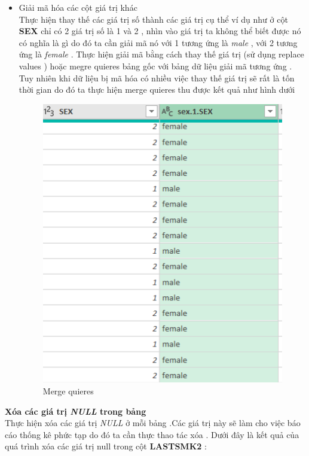 \begin{itemize}
\begin{figure}[!h]
\begin{center}
\end{center}
   \end{figure}
   \item Giải mã hóa các cột giá trị khác \\\hfill
   Thực hiện thay thế các giá trị số thành các giá trị cụ thể ví dụ như ở cột \textbf{SEX} chỉ có 2 giá trị số là 1 và 2 , nhìn vào giá trị ta không thể biết được nó có nghĩa là gì do đó ta cần giải mã nó với 1 tương ứng là\textit{ male} , với 2 tương ứng là\textit{ female }.
   Thực hiện giải mã bằng cách thay thế giá trị (sử dụng replace values ) hoặc megre quieres bảng gốc với bảng dữ liệu giải mã tương ứng . Tuy nhiên khi dữ liệu bị mã hóa có nhiều việc thay thế giá trị sẽ rất là tốn thời gian do đó ta thực hiện merge quieres thu được kết quả như hình dưới
     \begin{figure}[!h]
                \begin{center}
                \includegraphics[scale = 0.8]{HONG/5.png}
                \caption{Merge quieres}
                \end{center}
    \end{figure}
\end{itemize}
\textbf{Xóa các giá trị \textit{NULL} trong bảng }\\
Thực hiện xóa các giá trị \textit{NULL} ở mỗi bảng .Các giá trị này sẽ làm cho việc báo cáo thống kê phức  tạp do đó ta cần thực thao tác xóa . Dưới đây là kết quả của quá trình xóa các giá trị null trong cột \textbf{LASTSMK2} :
 
